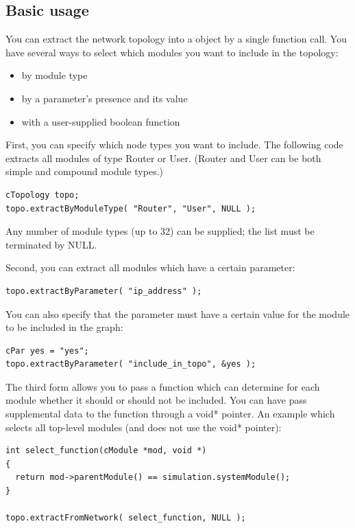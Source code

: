 \subsection{Basic usage}

You can extract the network topology into a 
object by a single function call. You have several ways to select
which modules you want to include in the topology:
\begin{itemize}
  \item{by module type}
  \item{by a parameter's presence and its value}
  \item{with a user-supplied boolean function}
\end{itemize}

First, you can specify which node types you want to include. The
following code extracts all modules of type Router or User. (Router
and User can be both simple and compound module types.)

\begin{verbatim}
cTopology topo;
topo.extractByModuleType( "Router", "User", NULL );
\end{verbatim}


Any number of module types (up to 32) can be supplied; the list
must be terminated by NULL.

Second, you can extract all modules which have a certain parameter:

\begin{verbatim}
topo.extractByParameter( "ip_address" );
\end{verbatim}


You can also specify that the parameter must have a certain value
for the module to be included in the graph:

\begin{verbatim}
cPar yes = "yes";
topo.extractByParameter( "include_in_topo", &yes );
\end{verbatim}

The third form allows you to pass a function which can determine for
each module whether it should or should not be included.  You can have
 pass supplemental data to the function through a
void* pointer. An example which selects all top-level modules (and
does not use the void* pointer):

\begin{verbatim}
int select_function(cModule *mod, void *)
{
  return mod->parentModule() == simulation.systemModule();
}

topo.extractFromNetwork( select_function, NULL );
\end{verbatim}

